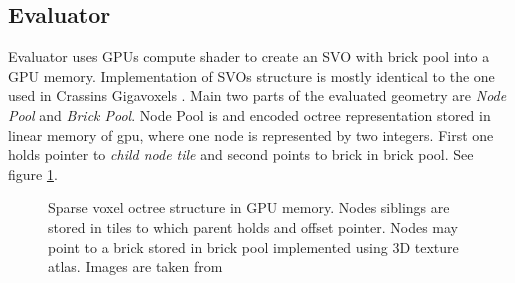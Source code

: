 \documentclass[11pt, a4paper]{article}
\begin{document}
\subsection{Evaluator}
Evaluator uses GPUs compute shader to create an SVO with brick pool into a GPU memory.
Implementation of SVOs structure is mostly identical to the one used in Crassins Gigavoxels \cite{crassin2011}.
Main two parts of the evaluated geometry are \emph{Node Pool} and \emph{Brick Pool}.
Node Pool is and encoded octree representation stored in linear memory of gpu, where one node is represented by two integers. First one holds pointer to \emph{child node tile} and second points to brick in brick pool. See figure \ref{fig_note_tree}.
\begin{figure}[ht!]
    \centering
    \hspace*{.2in}
    \caption{
        Sparse voxel octree structure in GPU memory.
        Nodes siblings are stored in tiles to which parent holds and offset pointer.
        Nodes may point to a brick stored in brick pool implemented using 3D texture atlas.
        Images are taken from \cite{crassin2011}
    }
    \label{fig_note_tree}
\end{figure}
\end{document}
